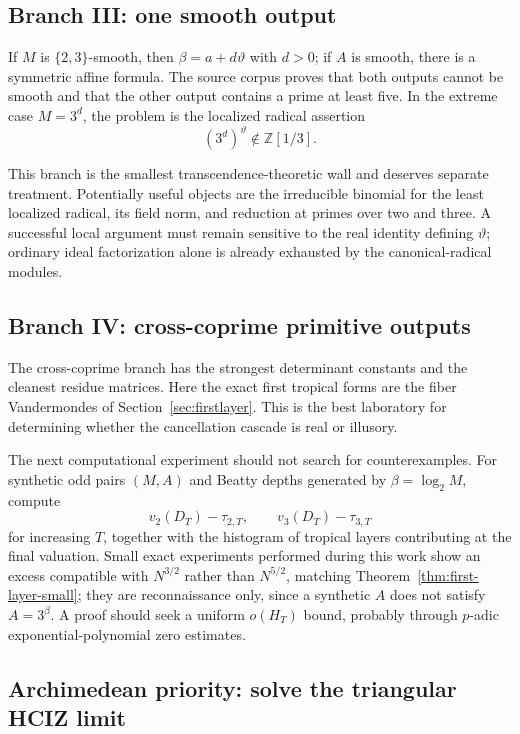 \documentclass[11pt,oneside]{article}
\theoremstyle{definition}
\theoremstyle{remark}
\newcommand{\Z}{\mathbb Z}
\begin{document}
\subsection{Branch III: one smooth output}

If $M$ is $\{2,3\}$-smooth, then $\beta=a+d\vartheta$ with $d>0$; if $A$ is smooth, there is a
symmetric affine formula.  The source corpus proves that both outputs cannot be smooth and
that the other output contains a prime at least five.  In the extreme case $M=3^d$, the
problem is the localized radical assertion
\[
 (3^d)^\vartheta\notin\Z[1/3].
\]

This branch is the smallest transcendence-theoretic wall and deserves separate treatment.
Potentially useful objects are the irreducible binomial for the least localized radical, its
field norm, and reduction at primes over two and three.  A successful local argument must
remain sensitive to the real identity defining $\vartheta$; ordinary ideal factorization
alone is already exhausted by the canonical-radical modules.

\subsection{Branch IV: cross-coprime primitive outputs}

The cross-coprime branch has the strongest determinant constants and the cleanest residue
matrices.  Here the exact first tropical forms are the fiber Vandermondes of
Section~\ref{sec:firstlayer}.  This is the best laboratory for determining whether the
cancellation cascade is real or illusory.

The next computational experiment should not search for counterexamples.  For synthetic odd
pairs $(M,A)$ and Beatty depths generated by $\beta=\log_2M$, compute
\[
 v_2(D_T)-\tau_{2,T},
 \qquad
 v_3(D_T)-\tau_{3,T}
\]
for increasing $T$, together with the histogram of tropical layers contributing at the final
valuation.  Small exact experiments performed during this work show an excess compatible with
$N^{3/2}$ rather than $N^{5/2}$, matching Theorem~\ref{thm:first-layer-small}; they are
reconnaissance only, since a synthetic $A$ does not satisfy $A=3^\beta$.  A proof should seek a
uniform $o(H_T)$ bound, probably through $p$-adic exponential-polynomial zero estimates.

\subsection{Archimedean priority: solve the triangular HCIZ limit}
\end{document}
